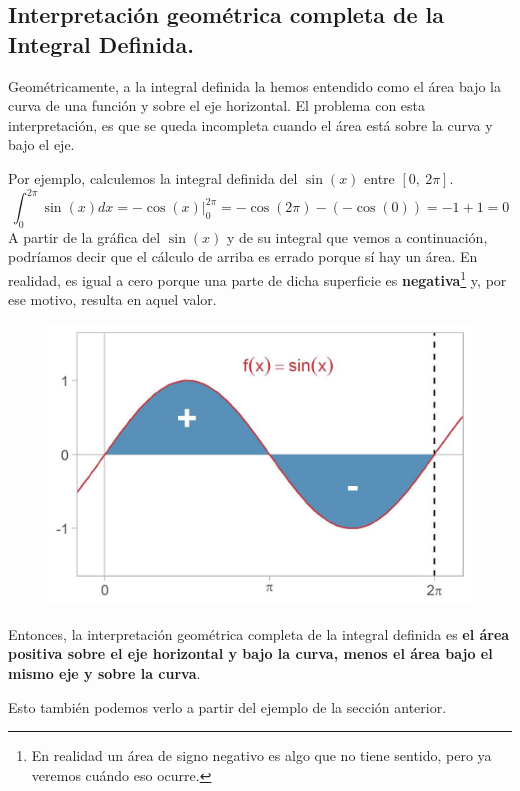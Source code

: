 \documentclass[12pt]{article}
\begin{document}
\subsection{Interpretación geométrica completa de la Integral Definida.}

Geométricamente, a la integral definida la hemos entendido como el área bajo la curva de una función y sobre el eje horizontal. El problema con esta interpretación, es que se queda incompleta cuando el área está sobre la curva y bajo el eje.

Por ejemplo, calculemos la integral definida del $\sin(x)$ entre $[0, \ 2\pi]$.
\[
  \int_{0}^{2\pi} \sin(x)dx = -\cos(x)|_{0}^{2\pi} = -\cos(2\pi) - (-\cos(0)) = -1 + 1 = 0 
\]
A partir de la gráfica del $\sin(x)$ y de su integral que vemos a continuación, podríamos decir que el cálculo de arriba es errado porque sí hay un área. En realidad, es igual a cero porque una parte de dicha superficie es \textbf{negativa}\footnote{En realidad un área de signo negativo es algo que no tiene sentido, pero ya veremos cuándo eso ocurre.} y, por ese motivo, resulta en aquel valor.

\begin{figure}[hbt!]
\centering
\includegraphics[scale=0.7]{img/def-int-sin-2.jpg}
\end{figure}

Entonces, la interpretación geométrica completa de la integral definida es \textbf{el área positiva sobre el eje horizontal y bajo la curva, menos el área bajo el mismo eje y sobre la curva}.

Esto también podemos verlo a partir del ejemplo de la sección anterior.
\end{document}
